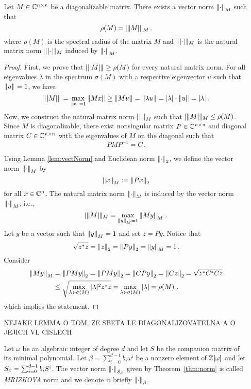 \begin{theo}
\label{thm:norm}
Let $M\in\mathbb{C}^{n\times n}$ be a diagonalizable matrix. There exists a vector norm $\left\lVert\cdot\right\rVert_{M}$ such that 
$$
\rho(M)=\left|\lVert M\right|\rVert_{M}\,,
$$
where $\rho(M)$ is the spectral radius of the matrix $M$ and $\left|\lVert\cdot\right|\rVert_{M}$ is the natural matrix norm $\left|\lVert\cdot\right|\rVert_{M}$ induced by $\left\lVert\cdot\right\rVert_{M}$.
\end{theo}
\begin{proof}
First, we prove that $\left|\lVert M\right|\rVert_{}\geq\rho(M)$ for every natural matrix norm. For all eigenvalues $\lambda$ in the spectrum $\sigma(M)$ with a respective eigenvector $u$ such that $\left\lVert u\right\rVert_{}=1$, we have
$$
\left|\lVert M\right|\rVert_{}=\max_{\left\lVert x\right\rVert_{}=1} \left\lVert Mx\right\rVert_{}\geq \left\lVert Mu\right\rVert_{}=\left\lVert\lambda u\right\rVert_{}=|\lambda|\cdot\left\lVert u\right\rVert_{}=|\lambda|\,.
$$
Now, we construct the natural matrix norm $\left\lVert\cdot\right\rVert_{M}$ such that $\left|\lVert M\right|\rVert_{M}\leq\rho(M)$. Since $M$ is diagonalizable, there exist nonsingular matrix $P\in\mathbb{C}^{n\times n}$ and diagonal matrix $C\in\mathbb{C}^{n\times n}$ with the eigenvalues of $M$ on the diagonal such that 
$$
PMP^{-1}=C\,.
$$ 

Using Lemma \ref{lem:vectNorm} and Euclidean norm $\left\lVert\cdot\right\rVert_{2}$, we define the vector norm $\left\lVert\cdot\right\rVert_{M}$ by 
\begin{equation}
\left\lVert x\right\rVert_{M}:=\left\lVert Px\right\rVert_{2}
\end{equation}
for all $x\in\mathbb{C}^n$. The natural matrix norm $\left\lVert\cdot\right\rVert_{M}$ is induced by the vector norm $\left\lVert\cdot\right\rVert_{M}$, i.e.,
$$
\left|\lVert M\right|\rVert_{M}=\max_{\left\lVert y\right\rVert_{M}=1} \left\lVert My\right\rVert_{M}\,.
$$
Let $y$ be a  vector such that $\left\lVert y\right\rVert_{M}=1$ and set $z=Py$. Notice that 
$$
\sqrt{z^*z}=\left\lVert z\right\rVert_{2}=\left\lVert Py\right\rVert_{2}=\left\lVert y\right\rVert_{M}=1\,.
$$
Consider
\begin{align*}
\left\lVert My\right\rVert_{M}&=\left\lVert PMy\right\rVert_{2}=\left\lVert PMy\right\rVert_{2}=\left\lVert CPy\right\rVert_{2}=\left\lVert Cz\right\rVert_{2}=\sqrt{z^*C^*Cz}\\
    &\leq \sqrt{\max_{\lambda\in\sigma(M)}|\lambda|^2 z^*z}=\max_{\lambda\in\sigma(M)}|\lambda|=\rho(M)\,\,.
\end{align*}
which implies the statement.
\end{proof}

NEJAKE LEMMA O TOM, ZE SBETA LE DIAGONALIZOVATELNA A O JEJICH VL CISLECH

\begin{defn}
Let $\omega$ be an algebraic integer of degree $d$ and let $S$ be the companion matrix of its minimal polynomial. Let $\beta=\sum_{i=0}^{d-1} b_i \omega^i$ be a nonzero element of $\mathbb{Z}[\omega]$ and let $S_\beta=\sum_{i=0}^{d-1} {b}_i S^i$. The vector norm $\left\lVert\cdot\right\rVert_{S_\beta}$ given by Theorem~\ref{thm:norm} is called \emph{MRIZKOVA} norm and we denote it briefly $\left\lVert\cdot\right\rVert_{\beta}$. 
\end{defn}
